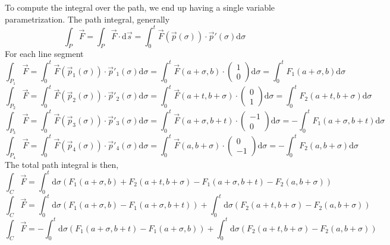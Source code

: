 \documentclass[letter]{article}
\begin{document}
To compute the integral over the path, we end up having a single variable parametrization. The path integral, generally
\[
\int_{P} \vec{F} = 
\int_{P} \vec{F} \cdot \mathrm{d} \vec{s} = 
\int_0^{t} \vec{F}(\vec{p}(\sigma)) \cdot \vec{p}'(\sigma) \mathrm{d} \sigma
\] 
For each line segment  
\[
	\int_{P_1} \vec{F} = 
	\int_0^{t} \vec{F}(\vec{p}_1(\sigma)) \cdot \vec{p}'_1(\sigma) \mathrm{d} \sigma = 
	\int_0^{t} \vec{F}(a+\sigma, b) \cdot \begin{pmatrix} 1 \\ 0 \end{pmatrix}  \mathrm{d} \sigma = 
	\int_0^{t} F_1(a+\sigma, b) \mathrm{d} \sigma
\] 
\[
	\int_{P_2} \vec{F} = 
	\int_0^{t} \vec{F}(\vec{p}_2(\sigma)) \cdot \vec{p}'_2(\sigma) \mathrm{d} \sigma = 
	\int_0^{t} \vec{F}(a+t, b+\sigma) \cdot \begin{pmatrix} 0 \\ 1 \end{pmatrix}  \mathrm{d} \sigma = 
	\int_0^{t} F_2(a+t, b+\sigma) \mathrm{d} \sigma
\] 
\[
	\int_{P_3} \vec{F} = 
	\int_0^{t} \vec{F}(\vec{p}_3(\sigma)) \cdot \vec{p}'_3(\sigma) \mathrm{d} \sigma = 
	\int_0^{t} \vec{F}(a+\sigma, b+t) \cdot \begin{pmatrix} -1 \\ 0 \end{pmatrix}  \mathrm{d} \sigma = 
-	\int_0^{t} F_1(a+\sigma, b+t) \mathrm{d} \sigma
\] 
\[
	\int_{P_4} \vec{F} = 
	\int_0^{t} \vec{F}(\vec{p}_4(\sigma)) \cdot \vec{p}'_4(\sigma) \mathrm{d} \sigma = 
	\int_0^{t} \vec{F}(a, b+\sigma) \cdot \begin{pmatrix} 0 \\ -1 \end{pmatrix}  \mathrm{d} \sigma = 
	-\int_0^{t} F_2(a, b+\sigma) \mathrm{d} \sigma
\]
The total path integral is then, 
\[
\int_C \vec{F} = 
\int_0^{t} \mathrm{d} \sigma \left(F_1(a+\sigma, b) + F_2 (a+t, b+\sigma) - F_1 (a+\sigma, b+t) - F_2(a,b+\sigma) \right)
\]
\[
\int_C \vec{F} = 
\int_0^{t} \mathrm{d} \sigma \left(
F_1(a+\sigma, b) - F_1(a+\sigma, b+t)
\right) + 
\int_{0}^{t} \mathrm{d} \sigma 
\left(
F_2(a+t, b+\sigma) - F_2(a, b+\sigma)
\right)
\]
\[
\int_C \vec{F} = 
- \int_0^{t} \mathrm{d} \sigma \left(
F_1(a+\sigma, b+t) - F_1(a+\sigma, b)
\right) + 
\int_{0}^{t} \mathrm{d} \sigma 
\left(
F_2(a+t, b+\sigma) - F_2(a, b+\sigma)
\right)
\]
\end{document}
